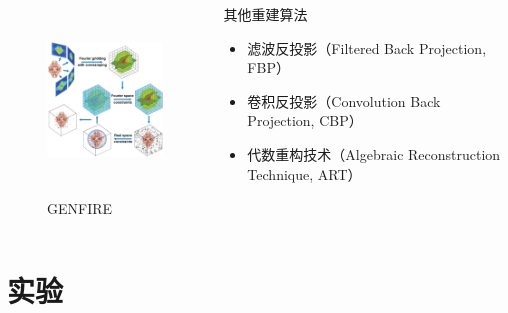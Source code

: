 \documentclass[12pt,aspectratio=169]{beamer} %
\begin{document}
\begin{frame}
    \begin{columns}
        \begin{column}{0.5\textwidth}
            \begin{figure}
                \includegraphics[height=5cm]{images/41598_2017_9847_Fig1_HTML.png}
                \caption{GENFIRE}
            \end{figure}
        \end{column}
        \begin{column}{0.5\textwidth}
            \begin{block}{其他重建算法}
                \begin{itemize}
                    \item 滤波反投影（Filtered Back Projection, FBP）
                    \item 卷积反投影（Convolution Back Projection, CBP）
                    \item 代数重构技术（Algebraic Reconstruction Technique, ART）
                \end{itemize}
            \end{block}
        \end{column}
    \end{columns}
\end{frame}

\section{实验}
\end{document}
